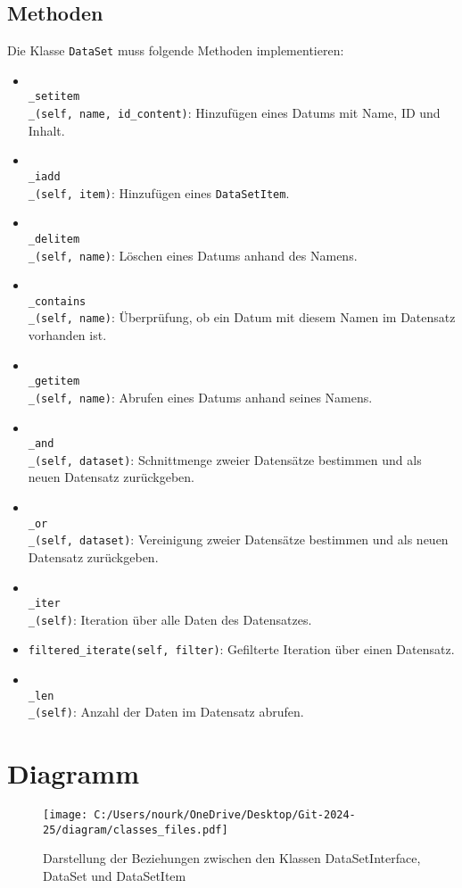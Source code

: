\documentclass[a4paper,12pt]{article}
\begin{document}
\subsection{Methoden}
Die Klasse \texttt{DataSet} muss folgende Methoden implementieren:
\begin{itemize}
    \item \texttt{\\_setitem\\_(self, name, id\_content)}: Hinzufügen eines Datums mit Name, ID und Inhalt.
    \item \texttt{\\_iadd\\_(self, item)}: Hinzufügen eines \texttt{DataSetItem}.
    \item \texttt{\\_delitem\\_(self, name)}: Löschen eines Datums anhand des Namens.
    \item \texttt{\\_contains\\_(self, name)}: Überprüfung, ob ein Datum mit diesem Namen im Datensatz vorhanden ist.
    \item \texttt{\\_getitem\\_(self, name)}: Abrufen eines Datums anhand seines Namens.
    \item \texttt{\\_and\\_(self, dataset)}: Schnittmenge zweier Datensätze bestimmen und als neuen Datensatz zurückgeben.
    \item \texttt{\\_or\\_(self, dataset)}: Vereinigung zweier Datensätze bestimmen und als neuen Datensatz zurückgeben.
    \item \texttt{\\_iter\\_(self)}: Iteration über alle Daten des Datensatzes.
    \item \texttt{filtered\_iterate(self, filter)}: Gefilterte Iteration über einen Datensatz.
    \item \texttt{\\_len\\_(self)}: Anzahl der Daten im Datensatz abrufen.
\end{itemize}

\section{Diagramm}
\begin{figure}[h]
\centering
\texttt{[image: C:/Users/nourk/OneDrive/Desktop/Git-2024-25/diagram/classes\_files.pdf]}
\caption{Darstellung der Beziehungen zwischen den Klassen DataSetInterface, DataSet und DataSetItem}
\label{fig:diagram}
\end{figure}
\end{document}
